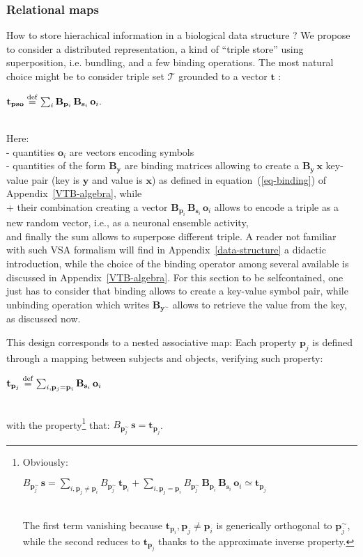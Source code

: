 \documentclass[sn-mathphys]{sn-jnl}
\newcommand{\defq}{\stackrel {\rm def}{=}}
\newcommand{\eqline}[1]{~\vspace{0.1cm}\\\centerline{$#1$}\vspace{0.1cm}\\}
\begin{document}
\subsubsection{Relational maps} \label{relational-map}

How to store hierachical information in a biological data structure ? We propose to consider a distributed representation, a kind of ``triple store'' using superposition, i.e. bundling, and a few binding operations. The most natural choice might be to consider triple set $\mathcal{T}$ grounded to a vector $\mathbf{t}$ :
\eqline{\mathbf{t}_{\mathbf{pso}} \defq \sum_i \mathbf{B}_{\mathbf{p}_i} \, \mathbf{B}_{\mathbf{s}_i} \, \mathbf{o}_i.}
Here:
\\ - quantities $\mathbf{o}_i$ are vectors encoding symbols
\\ - quantities of the form $\mathbf{B}_{\mathbf{y}}$ are binding matrices allowing to create a $\mathbf{B}_{\mathbf{y}} \, \mathbf{x}$ key-value pair (key is $\mathbf{y}$ and value is $\mathbf{x}$) as defined in equation~(\ref{eq-binding}) of Appendix~\ref{VTB-algebra}, while
\\ + their combination creating a vector $\mathbf{B}_{\mathbf{p}_i} \, \mathbf{B}_{\mathbf{s}_i} \, \mathbf{o}_i$ allows to encode a triple as a new random vector, i.e., as a neuronal ensemble activity,
\\ and finally the sum allows to superpose different triple. A reader not familiar with such VSA formalism will find in Appendix~\ref{data-structure} a didactic introduction, while the choice of the binding operator among several available \cite{schlegel_comparison_2020} is discussed in Appendix~\ref{VTB-algebra}. For this section to be selfcontained, one just has to consider that binding allows to create a key-value symbol pair, while unbinding operation which writes $\mathbf{B}_{\mathbf{y}^\sim}$ allows to retrieve the value from the key, as discussed now. 

This design corresponds to a nested associative map: Each property $\mathbf{p}_j$ is defined through a mapping between subjects and objects, verifying such property:
\eqline{\mathbf{t}_{\mathbf{p}_j} \defq \sum_{i, \mathbf{p}_j = \mathbf{p}_i} \mathbf{B}_{\mathbf{s}_i} \, \mathbf{o}_i}
with the property\footnote{
Obviously:
\eqline{B_{\mathbf{p}_j^\sim} \, \mathbf{s} =
  \sum_{i, \mathbf{p}_j \neq \mathbf{p}_i} B_{\mathbf{p}_j^\sim} \, \mathbf{t}_{\mathbf{p}_i} +
  \sum_{i, \mathbf{p}_j = \mathbf{p}_i}  B_{\mathbf{p}_j^\sim} \, \mathbf{B}_{\mathbf{p}_i} \, \mathbf{B}_{\mathbf{s}_i} \, \mathbf{o}_i \simeq \mathbf{t}_{\mathbf{p}_j}}
The first term vanishing because $\mathbf{t}_{\mathbf{p}_i}, \mathbf{p}_j \neq \mathbf{p}_i$ is generically orthogonal to $\mathbf{p}_j^\sim$, while the second reduces to $\mathbf{t}_{\mathbf{p}_j}$ thanks to the approximate inverse property.} that: $B_{\mathbf{p}_j^\sim} \, \mathbf{s} = \mathbf{t}_{\mathbf{p}_j}$.
\end{document}
